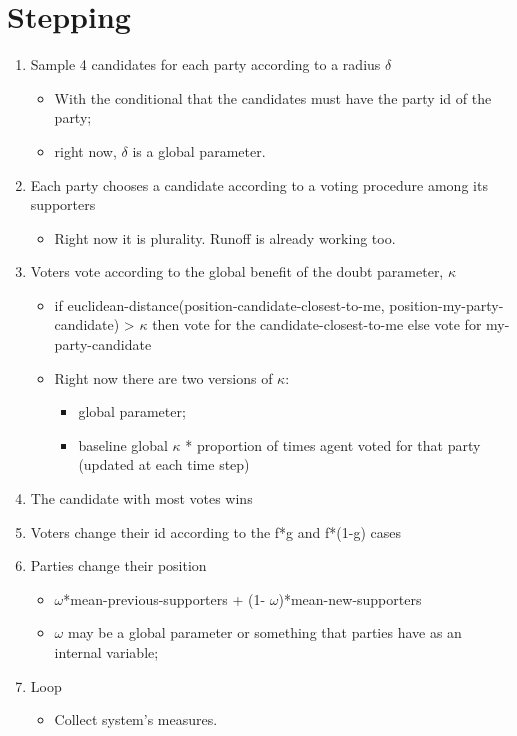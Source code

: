 \documentclass[11pt]{article}
\begin{document}
\section{Stepping}
\label{sec:orgea60518}
\begin{enumerate}
\item Sample 4 candidates for each party according to a radius \(\delta\)
\begin{itemize}
\item With the conditional that the candidates must have the party id of the party;
\item right now, \(\delta\) is a global parameter.
\end{itemize}
\item Each party chooses a candidate according to a voting procedure among its supporters
\begin{itemize}
\item Right now it is plurality. Runoff is already working too.
\end{itemize}
\item Voters vote according to the global benefit of the doubt parameter, \(\kappa\)
\begin{itemize}
\item if euclidean-distance(position-candidate-closest-to-me, position-my-party-candidate) > \(\kappa\) then vote for the candidate-closest-to-me else vote for my-party-candidate
\item Right now there are two versions of  \(\kappa\):
\begin{itemize}
\item global parameter;
\item baseline global \(\kappa\) * proportion of times agent voted for that party (updated at each time step)
\end{itemize}
\end{itemize}
\item The candidate with most votes wins

\item Voters change their id according to the f*g and f*(1-g) cases

\item Parties change their position
\begin{itemize}
\item \(\omega\)*mean-previous-supporters + (1- \(\omega\))*mean-new-supporters
\item \(\omega\) may be a global parameter or something that parties have as an internal variable;
\end{itemize}

\item Loop
\begin{itemize}
\item Collect system's measures.
\end{itemize}
\end{enumerate}
\end{document}
